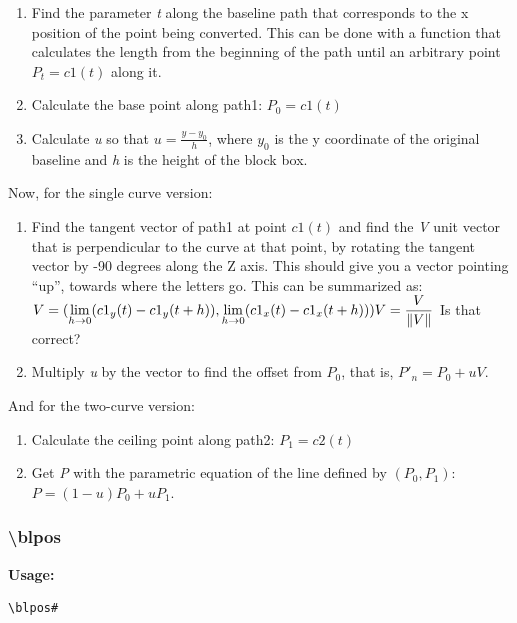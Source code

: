 \documentclass{spec}
\begin{document}
\begin{enumerate}
\item Find the parameter \emph{t} along the baseline path that corresponds to the x position of
the point being converted. This can be done with a function that calculates the length from the
beginning of the path until an arbitrary point $P_t = c1(t)$ along it.
\item Calculate the base point along path1: $P_0 = c1(t)$
\item Calculate \emph{u} so that $u = \frac{y-y_0}{h}$, where $y_0$ is the y coordinate of the original
baseline and \emph{h} is the height of the block box.
\end{enumerate}

Now, for the single curve version:

\begin{enumerate}
\item Find the tangent vector of path1 at point $c1(t)$ and find the \emph{V} unit vector that is
perpendicular to the curve at that point, by rotating the tangent vector by -90 degrees along the Z axis.
This should give you a vector pointing ``up'', towards where the letters go. This can be summarized as:\\
$\displaystyle V = ( \lim_{h \to 0} (c1_y(t)-c1_y(t+h)) , \lim _{h\to0} (c1_x(t)-c1_x(t+h)))\\
V = \frac{V}{\left \| V \right \|}\\$
\todo Is that correct?
\item Multiply \emph{u} by the vector to find the offset from $P_0$, that is, $P'_n = P_0 + u V$.
\end{enumerate}

And for the two-curve version:

\begin{enumerate}
\item Calculate the ceiling point along path2: $P_1 = c2(t)$
\item Get \emph{P} with the parametric equation of the line defined by $(P_0,P_1)$: $P = (1-u) P_0 + u P_1$.
\end{enumerate}

\subsubsection{\textbackslash blpos}
\textbf{Usage:}
\begin{verbatim}
\blpos#
\end{verbatim}
\end{document}

